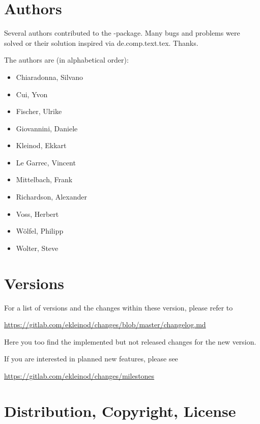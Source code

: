 \cleardoublepage
\section{Authors}
\label{sec:authors}

Several authors contributed to the -package.
Many bugs and problems were solved or their solution inspired via de.comp.text.tex.
Thanks.

The authors are (in alphabetical order):
\begin{itemize}
	\item Chiaradonna, Silvano
	\item Cui, Yvon
	\item Fischer, Ulrike
	\item Giovannini, Daniele
	\item Kleinod, Ekkart
	\item Le Garrec, Vincent
	\item Mittelbach, Frank
	\item Richardson, Alexander
	\item Voss, Herbert
	\item Wölfel, Philipp
	\item Wolter, Steve
\end{itemize}



\cleardoublepage
\section{Versions}
\label{sec:versions}

For a list of versions and the changes within these version, please refer to

\url{https://gitlab.com/ekleinod/changes/blob/master/changelog.md}

Here you too find the implemented but not released changes for the new version.

If you are interested in planned new features, please see

\url{https://gitlab.com/ekleinod/changes/milestones}


\cleardoublepage
\section{Distribution, Copyright, License}

